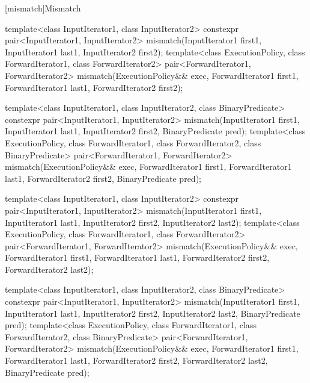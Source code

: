 [mismatch]{Mismatch}

%
\begin{itemdecl}
template<class InputIterator1, class InputIterator2>
  constexpr pair<InputIterator1, InputIterator2>
    mismatch(InputIterator1 first1, InputIterator1 last1,
             InputIterator2 first2);
template<class ExecutionPolicy, class ForwardIterator1, class ForwardIterator2>
  pair<ForwardIterator1, ForwardIterator2>
    mismatch(ExecutionPolicy&& exec,
             ForwardIterator1 first1, ForwardIterator1 last1,
             ForwardIterator2 first2);

template<class InputIterator1, class InputIterator2,
         class BinaryPredicate>
  constexpr pair<InputIterator1, InputIterator2>
    mismatch(InputIterator1 first1, InputIterator1 last1,
             InputIterator2 first2, BinaryPredicate pred);
template<class ExecutionPolicy, class ForwardIterator1, class ForwardIterator2,
         class BinaryPredicate>
  pair<ForwardIterator1, ForwardIterator2>
    mismatch(ExecutionPolicy&& exec,
             ForwardIterator1 first1, ForwardIterator1 last1,
             ForwardIterator2 first2, BinaryPredicate pred);

template<class InputIterator1, class InputIterator2>
  constexpr pair<InputIterator1, InputIterator2>
    mismatch(InputIterator1 first1, InputIterator1 last1,
             InputIterator2 first2, InputIterator2 last2);
template<class ExecutionPolicy, class ForwardIterator1, class ForwardIterator2>
  pair<ForwardIterator1, ForwardIterator2>
    mismatch(ExecutionPolicy&& exec,
             ForwardIterator1 first1, ForwardIterator1 last1,
             ForwardIterator2 first2, ForwardIterator2 last2);

template<class InputIterator1, class InputIterator2,
         class BinaryPredicate>
  constexpr pair<InputIterator1, InputIterator2>
    mismatch(InputIterator1 first1, InputIterator1 last1,
             InputIterator2 first2, InputIterator2 last2,
             BinaryPredicate pred);
template<class ExecutionPolicy, class ForwardIterator1, class ForwardIterator2,
         class BinaryPredicate>
  pair<ForwardIterator1, ForwardIterator2>
    mismatch(ExecutionPolicy&& exec,
             ForwardIterator1 first1, ForwardIterator1 last1,
             ForwardIterator2 first2, ForwardIterator2 last2,
             BinaryPredicate pred);


\end{itemdecl}

